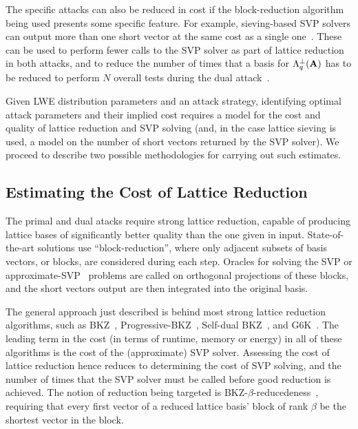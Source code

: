 The specific attacks can also be reduced in cost if the block-reduction algorithm being used presents some specific feature. For example, sieving-based SVP solvers can output more than one short vector at the same cost as a single one~\cite{USENIX:ADPS16}. These can be used to perform fewer calls to the SVP solver as part of lattice reduction~\cite{EC:ADHKPS19} in both attacks, and to reduce the number of times that a basis for $\Lambda_q^\perp(\mathbf{A})$ has to be reduced to perform $N$ overall tests during the dual attack~\cite{RSA:LaaWal21}.

Given LWE distribution parameters and an attack strategy, identifying optimal attack parameters and their implied cost requires a model for the cost and quality of lattice reduction and SVP solving (and, in the case lattice sieving is used, a model on the number of short vectors returned by the SVP solver). We proceed to describe two possible methodologies for carrying out such estimates.

\subsection{Estimating the Cost of Lattice Reduction}

The primal and dual atacks require strong lattice reduction, capable of producing lattice bases of significantly better quality than the one given in input.
State-of-the-art solutions use ``block-reduction'', where only adjacent subsets of basis vectors, or blocks, are considered during each step. Oracles for solving the SVP or approximate-SVP~\cite{_JoC:LiNgu24} problems are called on orthogonal projections of these blocks, and the short vectors output are then integrated into the original basis.

The general approach just described is behind most strong lattice reduction algorithms, such as BKZ~\cite{FCT:SE91,schnorr1994lattice}, Progressive-BKZ~\cite{EC:AWHT16}, Self-dual BKZ~\cite{EC:MicWal16}, and G6K~\cite{EC:ADHKPS19}. The leading term in the cost (in terms of runtime, memory or energy) in all of these algorithms is the cost of the (approximate) SVP solver. Assessing the cost of lattice reduction hence reduces to determining the cost of SVP solving, and the number of times that the SVP solver must be called before good reduction is achieved. The notion of reduction being targeted is BKZ-$\beta$-reducedeness~\cite{FCT:SE91,schnorr1994lattice}, requiring that every first vector of a reduced lattice basis' block of rank $\beta$ be the shortest vector in the block. 

